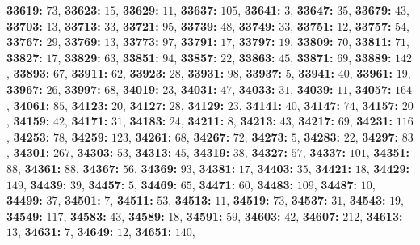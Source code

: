 \textsf{\bfseries 33619:} $73$, \textsf{\bfseries 33623:} $15$, \textsf{\bfseries 33629:} $11$, \textsf{\bfseries 33637:} $105$, \textsf{\bfseries 33641:} $3$, \textsf{\bfseries 33647:} $35$, \textsf{\bfseries 33679:} $43$, \textsf{\bfseries 33703:} $13$, \textsf{\bfseries 33713:} $33$, \textsf{\bfseries 33721:} $95$, \textsf{\bfseries 33739:} $48$, \textsf{\bfseries 33749:} $33$, \textsf{\bfseries 33751:} $12$, \textsf{\bfseries 33757:} $54$, \textsf{\bfseries 33767:} $29$, \textsf{\bfseries 33769:} $13$, \textsf{\bfseries 33773:} $97$, \textsf{\bfseries 33791:} $17$, \textsf{\bfseries 33797:} $19$, \textsf{\bfseries 33809:} $70$, \textsf{\bfseries 33811:} $71$, \textsf{\bfseries 33827:} $17$, \textsf{\bfseries 33829:} $63$, \textsf{\bfseries 33851:} $94$, \textsf{\bfseries 33857:} $22$, \textsf{\bfseries 33863:} $45$, \textsf{\bfseries 33871:} $69$, \textsf{\bfseries 33889:} $142$, \textsf{\bfseries 33893:} $67$, \textsf{\bfseries 33911:} $62$, \textsf{\bfseries 33923:} $28$, \textsf{\bfseries 33931:} $98$, \textsf{\bfseries 33937:} $5$, \textsf{\bfseries 33941:} $40$, \textsf{\bfseries 33961:} $19$, \textsf{\bfseries 33967:} $26$, \textsf{\bfseries 33997:} $68$, \textsf{\bfseries 34019:} $23$, \textsf{\bfseries 34031:} $47$, \textsf{\bfseries 34033:} $31$, \textsf{\bfseries 34039:} $11$, \textsf{\bfseries 34057:} $164$, \textsf{\bfseries 34061:} $85$, \textsf{\bfseries 34123:} $20$, \textsf{\bfseries 34127:} $28$, \textsf{\bfseries 34129:} $23$, \textsf{\bfseries 34141:} $40$, \textsf{\bfseries 34147:} $74$, \textsf{\bfseries 34157:} $20$, \textsf{\bfseries 34159:} $42$, \textsf{\bfseries 34171:} $31$, \textsf{\bfseries 34183:} $24$, \textsf{\bfseries 34211:} $8$, \textsf{\bfseries 34213:} $43$, \textsf{\bfseries 34217:} $69$, \textsf{\bfseries 34231:} $116$, \textsf{\bfseries 34253:} $78$, \textsf{\bfseries 34259:} $123$, \textsf{\bfseries 34261:} $68$, \textsf{\bfseries 34267:} $72$, \textsf{\bfseries 34273:} $5$, \textsf{\bfseries 34283:} $22$, \textsf{\bfseries 34297:} $83$, \textsf{\bfseries 34301:} $267$, \textsf{\bfseries 34303:} $53$, \textsf{\bfseries 34313:} $45$, \textsf{\bfseries 34319:} $38$, \textsf{\bfseries 34327:} $57$, \textsf{\bfseries 34337:} $101$, \textsf{\bfseries 34351:} $88$, \textsf{\bfseries 34361:} $88$, \textsf{\bfseries 34367:} $56$, \textsf{\bfseries 34369:} $93$, \textsf{\bfseries 34381:} $17$, \textsf{\bfseries 34403:} $35$, \textsf{\bfseries 34421:} $18$, \textsf{\bfseries 34429:} $149$, \textsf{\bfseries 34439:} $39$, \textsf{\bfseries 34457:} $5$, \textsf{\bfseries 34469:} $65$, \textsf{\bfseries 34471:} $60$, \textsf{\bfseries 34483:} $109$, \textsf{\bfseries 34487:} $10$, \textsf{\bfseries 34499:} $37$, \textsf{\bfseries 34501:} $7$, \textsf{\bfseries 34511:} $53$, \textsf{\bfseries 34513:} $11$, \textsf{\bfseries 34519:} $73$, \textsf{\bfseries 34537:} $31$, \textsf{\bfseries 34543:} $19$, \textsf{\bfseries 34549:} $117$, \textsf{\bfseries 34583:} $43$, \textsf{\bfseries 34589:} $18$, \textsf{\bfseries 34591:} $59$, \textsf{\bfseries 34603:} $42$, \textsf{\bfseries 34607:} $212$, \textsf{\bfseries 34613:} $13$, \textsf{\bfseries 34631:} $7$, \textsf{\bfseries 34649:} $12$, \textsf{\bfseries 34651:} $140$, 
